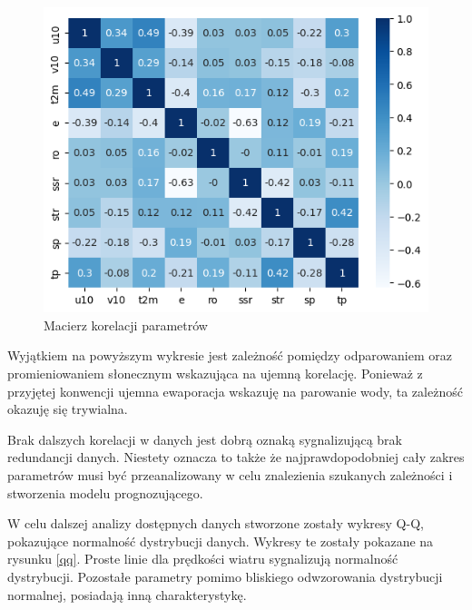 \begin{figure}[H]
    \centering
    \includegraphics[width=\textwidth]{images/correlation_matrix.png}
    \caption{Macierz korelacji parametrów}
    \label{matrix}
\end{figure}

Wyjątkiem na powyższym wykresie jest zależność pomiędzy odparowaniem oraz promieniowaniem 
słonecznym wskazująca na ujemną korelację. Ponieważ z przyjętej konwencji ujemna ewaporacja
wskazuję na parowanie wody, ta zależność okazuję się trywialna. 

Brak dalszych korelacji w danych jest dobrą oznaką sygnalizującą brak redundancji danych.
Niestety oznacza to także że najprawdopodobniej cały zakres parametrów musi być przeanalizowany
w celu znalezienia szukanych zależności i stworzenia modelu prognozującego. 

W celu dalszej analizy dostępnych danych stworzone zostały wykresy Q-Q, pokazujące normalność
dystrybucji danych. Wykresy te zostały pokazane na rysunku \ref{qq}. Proste linie dla prędkości 
wiatru sygnalizują normalność dystrybucji. Pozostałe parametry pomimo bliskiego odwzorowania
dystrybucji normalnej, posiadają inną charakterystykę. 


